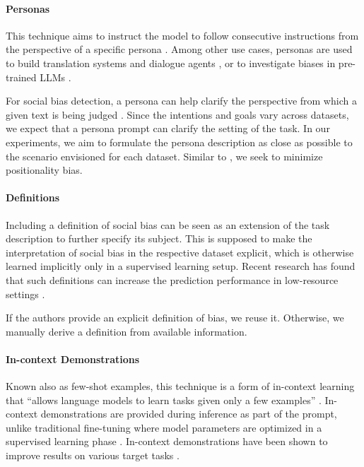 \paragraph{Personas}

This technique aims to instruct the model to follow consecutive instructions from the perspective of a specific persona \cite{thoppilan2022,deshpande2023}. Among other use cases, personas are used to build translation systems \cite{he2024} and dialogue agents \cite{thoppilan2022,xu2023}, or to investigate biases in pre-trained LLMs \cite{beck2024}.

For social bias detection, a persona can help clarify the perspective from which a given text is being judged \cite{giorgi2024}. Since the intentions and goals vary across datasets, we expect that a persona prompt can clarify the setting of the task. In our experiments, we aim to formulate the persona description as close as possible to the scenario envisioned for each dataset. Similar to \citet{xu2023}, we seek to minimize positionality bias.


\paragraph{Definitions}

Including a definition of social bias can be seen as an extension of the task description to further specify its subject. This is supposed to make the interpretation of social bias in the respective dataset explicit, which is otherwise learned implicitly only in a supervised learning setup. Recent research has found that such definitions can increase the prediction performance in low-resource settings \cite{elsner2023}.

If the authors provide an explicit definition of bias, we reuse it. Otherwise, we manually derive a definition from available information.


\paragraph{In-context Demonstrations}
Known also as few-shot examples, this technique is a form of in-context learning that ``allows language models to learn tasks given only a few examples'' \cite{dong2024}. In-context demonstrations are provided during inference as part of the prompt, unlike traditional fine-tuning where model parameters are optimized in a supervised learning phase \cite{mosbach2023}. In-context demonstrations have been shown to improve results on various target tasks \cite{zamfirescu-pereira2023,dong2024}.

